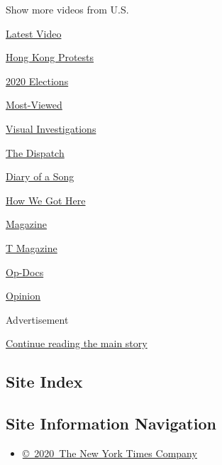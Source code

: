 Show more videos from U.S.

\href{/video}{}

\href{/video/latest-video}{Latest Video}

\href{/video/hk-protest}{Hong Kong Protests}

\href{/video/2020-Elections}{2020 Elections}

\href{/video/Most-Viewed}{Most-Viewed}

\href{/video/investigations}{Visual Investigations}

\href{/video/on-the-ground}{The Dispatch}

\href{/video/diaryofasong}{Diary of a Song}

\href{/video/how-we-got-here}{How We Got Here}

\href{/video/magazine}{Magazine}

\href{/video/t-magazine}{T Magazine}

\href{/video/op-docs}{Op-Docs}

\href{/video/opinion}{Opinion}

Advertisement

\protect\hyperlink{after-bottom}{Continue reading the main story}

\hypertarget{site-index}{%
\subsection{Site Index}\label{site-index}}

\hypertarget{site-information-navigation}{%
\subsection{Site Information
Navigation}\label{site-information-navigation}}

\begin{itemize}
\tightlist
\item
  \href{https://help.nytimes3xbfgragh.onion/hc/en-us/articles/115014792127-Copyright-notice}{©~2020~The
  New York Times Company}
\end{itemize}

